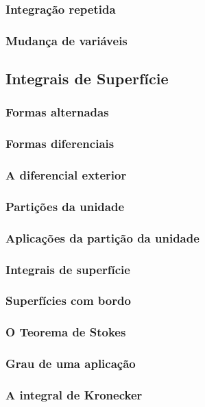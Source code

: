 \documentclass{article}
\theoremstyle{theorem}
\theoremstyle{lemma}
\theoremstyle{definition}
\theoremstyle{remark}
\begin{document}
   \subsubsection{Integração repetida}
   \subsubsection{Mudança de variáveis}

\subsection{ Integrais de Superfície}
   \subsubsection{Formas alternadas}
   \subsubsection{Formas diferenciais}
   \subsubsection{A diferencial exterior}
   \subsubsection{Partições da unidade}
   \subsubsection{Aplicações da partição da unidade}
   \subsubsection{Integrais de superfície}
   \subsubsection{Superfícies com bordo}
   \subsubsection{O Teorema de Stokes}
   \subsubsection{Grau de uma aplicação}
   \subsubsection{ A integral de Kronecker}
\end{document}
